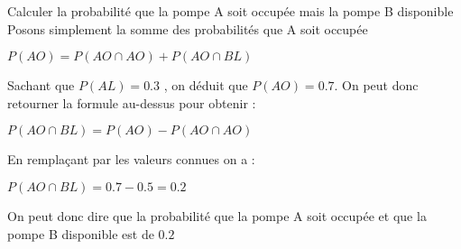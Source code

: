 \begin{exo}
\begin{subexo}{Calculer la probabilité que la pompe A soit occupée mais la pompe B disponible}
  Posons simplement la somme des probabilités que A soit occupée
  \begin{center}
    $P(AO) = P(AO \cap AO) + P(AO \cap BL)$
  \end{center}
  Sachant que $P(AL) = 0.3$ , on déduit que $P(AO) = 0.7$. On peut donc retourner la formule au-dessus pour obtenir :
  \begin{center}
    $P(AO \cap BL) = P(AO) - P(AO \cap AO)$
  \end{center}
En remplaçant par les valeurs connues on a :
\begin{center}
  $P(AO \cap BL) = 0.7 - 0.5 = 0.2$
\end{center}
On peut donc dire que la probabilité que la pompe A soit occupée et que la pompe B disponible est de $0.2$
\end{subexo}
\end{exo}
